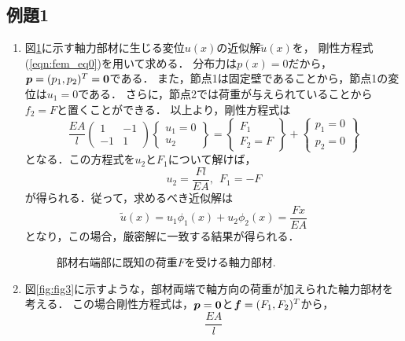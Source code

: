 \documentclass[10pt,a4j]{jarticle}
\begin{document}
\subsection{例題1}
\begin{enumerate}
\item
図\ref{fig:fig2}に示す軸力部材に生じる変位$u(x)$の近似解$\tilde u(x)$を，
剛性方程式(\ref{eqn:fem_eq0})を用いて求める．
分布力は$p(x)=0$だから，$\mbox{\boldmath $p$}=(p_1,p_2)^T=\mbox{\boldmath $0$}$である．
また，節点1は固定壁であることから，節点1の変位は$u_1=0$である．
さらに，節点2では荷重が与えられていることから$f_2=F$と置くことができる．
以上より，剛性方程式は
\begin{equation}
	\frac{EA}{l}
	\left(
	\begin{array}{cc}
		1 & -1 \\
		-1 & 1
	\end{array}
	\right)
	\left\{
	\begin{array}{c}
		u_1=0 \\
		u_2
	\end{array}
	\right\}
	=
	\left\{
	\begin{array}{c}
		F_1\\
		F_2=F
	\end{array}
	\right\}
	+
	\left\{
	\begin{array}{c}
		p_1=0\\
		p_2=0
	\end{array}
	\right\}
\end{equation}
となる．この方程式を$u_2$と$F_1$について解けば，
\begin{equation}
	u_2=\frac{Fl}{EA}, \ \ F_1=-F
	\label{eqn:}
\end{equation}
が得られる．従って，求めるべき近似解は
\begin{equation}
	\tilde u(x)=u_1\phi_1(x)+u_2\phi_2(x)=\frac{Fx}{EA}
	\label{eqn:apprx1}
\end{equation}
となり，この場合，厳密解に一致する結果が得られる．
\begin{figure}[h]
	\begin{center}
	\end{center}
	\caption{部材右端部に既知の荷重$F$を受ける軸力部材.} 
	\label{fig:fig2}
\end{figure}
\item
図\ref{fig:fig3}に示すような，部材両端で軸方向の荷重が加えられた軸力部材を考える．
この場合剛性方程式は，$\mbox{\boldmath $p$}=\mbox{\boldmath $0$}$と$\mbox{\boldmath $f$}=(F_1,F_2)^T$から，
\begin{equation}
	\frac{EA}{l}

\end{equation}
\end{enumerate}
\end{document}
